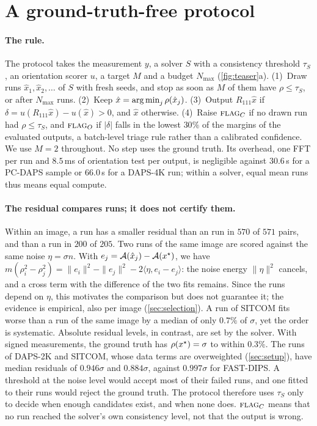 \section{A ground-truth-free protocol}
\label{sec:protocol}

\paragraph{The rule.}
The protocol takes the measurement $y$, a solver $S$ with a consistency threshold $\tau_S$, an orientation scorer $u$, a target $M$ and a budget $N_{\max}$ (\cref{fig:teaser}a).
(1)~Draw runs $\hat x_1,\hat x_2,\dots$ of $S$ with fresh seeds, and stop as soon as $M$ of them have $\rho\le\tau_S$, or after $N_{\max}$ runs.
(2)~Keep $\hat x=\operatorname*{arg\,min}_j\rho(\hat x_j)$.
(3)~Output $R_{111}\hat x$ if $\delta=u(R_{111}\hat x)-u(\hat x)>0$, and $\hat x$ otherwise.
(4)~Raise $\textsc{flag}_C$ if no drawn run had $\rho\le\tau_S$, and $\textsc{flag}_O$ if $|\delta|$ falls in the lowest $30\%$ of the margins of the evaluated outputs, a batch-level triage rule rather than a calibrated confidence.
We use $M=2$ throughout.
No step uses the ground truth.
Its overhead, one FFT per run and $8.5$\,ms of orientation test per output, is negligible against $30.6$\,s for a PC-DAPS sample or $66.0$\,s for a DAPS-4K run; within a solver, equal mean runs thus means equal compute.

\paragraph{The residual compares runs; it does not certify them.}
Within an image, a \good run has a smaller residual than an \incons run in $570$ of $571$ pairs, and than a \cons run in $200$ of $205$.
Two runs of the same image are scored against the same noise $\eta=\sigma n$.
With $e_j=\mathcal{A}(\hat x_j)-\mathcal{A}(x^\star)$, we have $m(\rho_i^2-\rho_j^2)=\|e_i\|^2-\|e_j\|^2-2\langle\eta,e_i-e_j\rangle$: the noise energy $\|\eta\|^2$ cancels, and a cross term with the difference of the two fits remains.
Since the runs depend on $\eta$, this motivates the comparison but does not guarantee it; the evidence is empirical, also per image (\cref{sec:selection}).
A \cons run of SITCOM fits worse than a \good run of the same image by a median of only $0.7\%$ of $\sigma$, yet the order is systematic.
Absolute residual levels, in contrast, are set by the solver.
With signed measurements, the ground truth has $\rho(x^\star)=\sigma$ to within $0.3\%$.
The \good runs of DAPS-2K and SITCOM, whose data terms are overweighted (\cref{sec:setup}), have median residuals of $0.946\sigma$ and $0.884\sigma$, against $0.997\sigma$ for FAST-DIPS.
A threshold at the noise level would accept most of their failed runs, and one fitted to their \good runs would reject the ground truth.
The protocol therefore uses $\tau_S$ only to decide when enough candidates exist, and when none does.
$\textsc{flag}_C$ means that no run reached the solver's own consistency level, not that the output is wrong.

